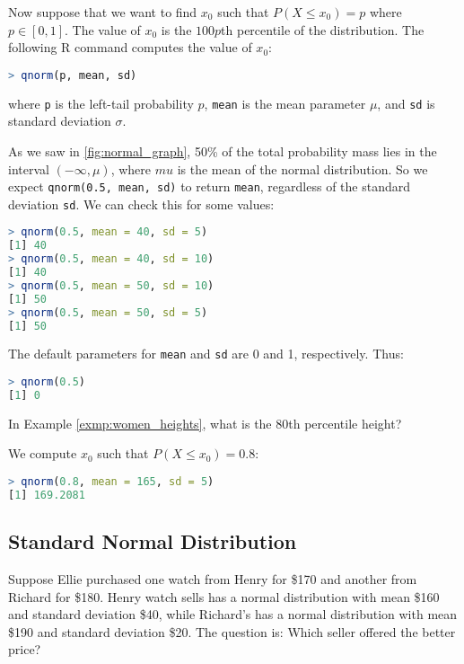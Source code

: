 Now suppose that we want to find \( x_0 \) such that \( P(X \leq x_0) = p \) where \( p \in [0, 1] \).
The value of \( x_0 \) is the \( 100p \)th percentile of the distribution.
The following R command computes the value of \( x_0 \):
\begin{lstlisting}[language=R]
> qnorm(p, mean, sd)
\end{lstlisting}
where \verb|p| is the left-tail probability  \( p \), \verb|mean| is the mean parameter \( \mu \), and \verb|sd| is standard deviation \( \sigma \).
\begin{exmp}
    As we saw in \autoref{fig:normal_graph}, 50\% of the total probability mass lies in the interval \( (-\infty, \mu) \), where \( mu \) is the mean of the normal distribution.
    So we expect \verb|qnorm(0.5, mean, sd)| to return \verb|mean|, regardless of the standard deviation \verb|sd|.
    We can check this for some values:
    \begin{lstlisting}[language=R]
> qnorm(0.5, mean = 40, sd = 5)
[1] 40
> qnorm(0.5, mean = 40, sd = 10)
[1] 40
> qnorm(0.5, mean = 50, sd = 10)
[1] 50
> qnorm(0.5, mean = 50, sd = 5)
[1] 50
    \end{lstlisting}
    The default parameters for \verb|mean| and \verb|sd| are 0 and 1, respectively. Thus:
    \begin{lstlisting}[language=R]
> qnorm(0.5)
[1] 0
    \end{lstlisting}
\end{exmp}
\begin{exmp}
    In Example \autoref{exmp:women_heights}, what is the 80th percentile height?
\end{exmp}
\begin{solution}
    We compute \( x_0 \) such that \( P(X \leq x_0) = 0.8 \):
    \begin{lstlisting}[language=R]
> qnorm(0.8, mean = 165, sd = 5)
[1] 169.2081        
    \end{lstlisting}
\end{solution}

\subsection{Standard Normal Distribution}

Suppose Ellie purchased one watch from Henry for \$170 and another from Richard for \$180.
Henry watch sells has a normal distribution with mean \$160 and standard deviation \$40,
while Richard's has a normal distribution with mean \$190 and standard deviation \$20.
The question is: Which seller offered the better price?


